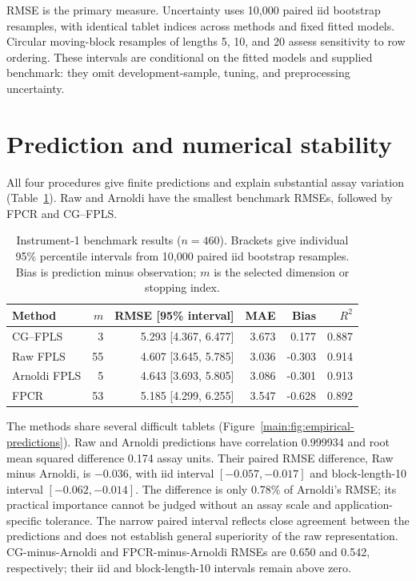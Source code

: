 RMSE is the primary measure.  Uncertainty uses 10,000 paired iid bootstrap
resamples, with identical tablet indices across methods and fixed fitted
models.  Circular moving-block resamples of lengths 5, 10, and 20 assess
sensitivity to row ordering.  These intervals are conditional on the fitted
models and supplied benchmark: they omit development-sample, tuning, and
preprocessing uncertainty.

\section{Prediction and numerical stability}
\label{main:sec:empirical-results}

All four procedures give finite predictions and explain substantial assay
variation (Table~\ref{main:tab:empirical-results}).  Raw and Arnoldi have the
smallest benchmark RMSEs, followed by FPCR and CG--FPLS.

\begin{table}[htbp]
    \centering
    \small
    \caption[Primary tablet benchmark results]{Instrument-1 benchmark results
    ($n=460$).  Brackets give individual 95\% percentile intervals from
    10,000 paired iid bootstrap resamples.  Bias is prediction minus
    observation; $m$ is the selected dimension or stopping index.}
    \label{main:tab:empirical-results}
    \begin{tabular}{@{}lrrrrr@{}}
        \toprule
        Method & $m$ & RMSE [95\% interval] & MAE & Bias & $R^2$ \\
        \midrule
        CG--FPLS     & 3  & 5.293 [4.367, 6.477] & 3.673 &  0.177 & 0.887 \\
        Raw FPLS     & 55 & 4.607 [3.645, 5.785] & 3.036 & -0.303 & 0.914 \\
        Arnoldi FPLS & 5  & 4.643 [3.693, 5.805] & 3.086 & -0.301 & 0.913 \\
        FPCR         & 53 & 5.185 [4.299, 6.255] & 3.547 & -0.628 & 0.892 \\
        \bottomrule
    \end{tabular}
\end{table}

The methods share several difficult tablets
(Figure~\ref{main:fig:empirical-predictions}).  Raw and Arnoldi predictions
have correlation 0.999934 and root mean squared difference 0.174 assay units.
Their paired RMSE difference, Raw minus Arnoldi, is $-0.036$, with iid
interval $[-0.057,-0.017]$ and block-length-10 interval
$[-0.062,-0.014]$.  The difference is only 0.78\% of Arnoldi's RMSE;
its practical importance cannot be judged without an assay scale and
application-specific tolerance.  The narrow paired interval reflects close
agreement between the predictions and does not establish general superiority
of the raw representation.  CG-minus-Arnoldi and FPCR-minus-Arnoldi RMSEs
are 0.650 and 0.542, respectively; their iid and block-length-10 intervals
remain above zero.

